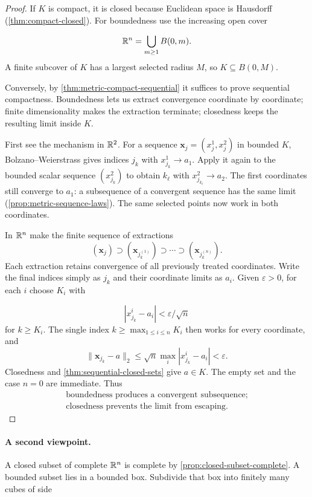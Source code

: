 \begin{proof}
If $K$ is compact, it is closed because Euclidean space is Hausdorff
(\cref{thm:compact-closed}). For boundedness use the increasing open cover

\[
\mathbb{R}^n=\bigcup_{m\geq1}B(0,m).
\]
 A finite subcover of $K$ has a largest
selected radius $M$, so $K\subseteq B(0,M)$.

Conversely, by \cref{thm:metric-compact-sequential} it suffices to prove
sequential compactness. Boundedness lets us extract convergence coordinate
by coordinate; finite dimensionality makes the extraction terminate;
closedness keeps the resulting limit inside $K$.

First see the mechanism in $\mathbb{R}^2$. For a sequence
$\mathbf{x}_j=(x_j^1,x_j^2)$ in bounded $K$, Bolzano--Weierstrass gives indices
$j_k$ with $x_{j_k}^1\to a_1$. Apply it again to the bounded scalar
sequence $(x_{j_k}^2)$ to obtain $k_\ell$ with $x_{j_{k_\ell}}^2\to a_2$.
The first coordinates still converge to $a_1$: a subsequence of a
convergent sequence has the same limit (\cref{prop:metric-sequence-laws}).
The same selected points now work in both coordinates.

In $\mathbb{R}^n$ make the finite sequence of extractions
\[
(\mathbf{x}_j)\supset(\mathbf{x}_{j_k^{(1)}})\supset\cdots\supset(\mathbf{x}_{j_k^{(n)}}).
\]
Each extraction retains convergence of all previously treated coordinates.
Write the final indices simply as $j_k$ and their coordinate limits as
$a_i$. Given $\varepsilon>0$, for each $i$ choose $K_i$ with

\[
|x_{j_k}^i-a_i|<\varepsilon/\sqrt n
\]
 for $k\geq K_i$. The single index
$k\geq\max_{1\leq i\leq n}K_i$ then works for every coordinate, and
\[
\|\mathbf{x}_{j_k}-a\|_2\leq\sqrt n\max_i|x_{j_k}^i-a_i|<\varepsilon.
\]
Closedness and \cref{thm:sequential-closed-sets} give $a\in K$.
The empty set and the case $n=0$ are immediate. Thus
\[
\boxed{\begin{gathered}
\text{boundedness produces a convergent subsequence;}\\
\text{closedness prevents the limit from escaping.}
\end{gathered}}
\]
\end{proof}
\paragraph{A second viewpoint.}
A closed subset of complete $\mathbb{R}^n$ is complete by
\cref{prop:closed-subset-complete}. A bounded subset lies in a bounded
box. Subdivide that box into finitely many cubes of side

